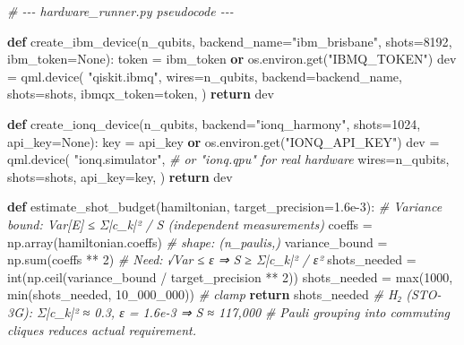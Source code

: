 \documentclass[
  11pt,
]{report}
\newenvironment{Shaded}{}{}
\newcommand{\BuiltInTok}[1]{\textcolor[rgb]{0.00,0.50,0.00}{#1}}
\newcommand{\CommentTok}[1]{\textcolor[rgb]{0.38,0.63,0.69}{\textit{#1}}}
\newcommand{\ControlFlowTok}[1]{\textcolor[rgb]{0.00,0.44,0.13}{\textbf{#1}}}
\newcommand{\DecValTok}[1]{\textcolor[rgb]{0.25,0.63,0.44}{#1}}
\newcommand{\FloatTok}[1]{\textcolor[rgb]{0.25,0.63,0.44}{#1}}
\newcommand{\KeywordTok}[1]{\textcolor[rgb]{0.00,0.44,0.13}{\textbf{#1}}}
\newcommand{\NormalTok}[1]{#1}
\newcommand{\OperatorTok}[1]{\textcolor[rgb]{0.40,0.40,0.40}{#1}}
\newcommand{\StringTok}[1]{\textcolor[rgb]{0.25,0.44,0.63}{#1}}
\newcommand{\VariableTok}[1]{\textcolor[rgb]{0.10,0.09,0.49}{#1}}
\begin{document}
\begin{Shaded}
\begin{Highlighting}[]
\CommentTok{\# {-}{-}{-} hardware\_runner.py pseudocode {-}{-}{-}}

\KeywordTok{def}\NormalTok{ create\_ibm\_device(n\_qubits, backend\_name}\OperatorTok{=}\StringTok{"ibm\_brisbane"}\NormalTok{,}
\NormalTok{                      shots}\OperatorTok{=}\DecValTok{8192}\NormalTok{, ibm\_token}\OperatorTok{=}\VariableTok{None}\NormalTok{):}
\NormalTok{    token }\OperatorTok{=}\NormalTok{ ibm\_token }\KeywordTok{or}\NormalTok{ os.environ.get(}\StringTok{"IBMQ\_TOKEN"}\NormalTok{)}
\NormalTok{    dev }\OperatorTok{=}\NormalTok{ qml.device(}
        \StringTok{"qiskit.ibmq"}\NormalTok{,}
\NormalTok{        wires}\OperatorTok{=}\NormalTok{n\_qubits,}
\NormalTok{        backend}\OperatorTok{=}\NormalTok{backend\_name,}
\NormalTok{        shots}\OperatorTok{=}\NormalTok{shots,}
\NormalTok{        ibmqx\_token}\OperatorTok{=}\NormalTok{token,}
\NormalTok{    )}
    \ControlFlowTok{return}\NormalTok{ dev}


\KeywordTok{def}\NormalTok{ create\_ionq\_device(n\_qubits, backend}\OperatorTok{=}\StringTok{"ionq\_harmony"}\NormalTok{,}
\NormalTok{                       shots}\OperatorTok{=}\DecValTok{1024}\NormalTok{, api\_key}\OperatorTok{=}\VariableTok{None}\NormalTok{):}
\NormalTok{    key }\OperatorTok{=}\NormalTok{ api\_key }\KeywordTok{or}\NormalTok{ os.environ.get(}\StringTok{"IONQ\_API\_KEY"}\NormalTok{)}
\NormalTok{    dev }\OperatorTok{=}\NormalTok{ qml.device(}
        \StringTok{"ionq.simulator"}\NormalTok{,           }\CommentTok{\# or "ionq.qpu" for real hardware}
\NormalTok{        wires}\OperatorTok{=}\NormalTok{n\_qubits,}
\NormalTok{        shots}\OperatorTok{=}\NormalTok{shots,}
\NormalTok{        api\_key}\OperatorTok{=}\NormalTok{key,}
\NormalTok{    )}
    \ControlFlowTok{return}\NormalTok{ dev}


\KeywordTok{def}\NormalTok{ estimate\_shot\_budget(hamiltonian, target\_precision}\OperatorTok{=}\FloatTok{1.6e{-}3}\NormalTok{):}
    \CommentTok{\# Variance bound: Var[E] ≤ Σ|c\_k|² / S  (independent measurements)}
\NormalTok{    coeffs }\OperatorTok{=}\NormalTok{ np.array(hamiltonian.coeffs)    }\CommentTok{\# shape: (n\_paulis,)}
\NormalTok{    variance\_bound }\OperatorTok{=}\NormalTok{ np.}\BuiltInTok{sum}\NormalTok{(coeffs }\OperatorTok{**} \DecValTok{2}\NormalTok{)}
    \CommentTok{\# Need: √Var ≤ ε ⇒ S ≥ Σ|c\_k|² / ε²}
\NormalTok{    shots\_needed }\OperatorTok{=} \BuiltInTok{int}\NormalTok{(np.ceil(variance\_bound }\OperatorTok{/}\NormalTok{ target\_precision }\OperatorTok{**} \DecValTok{2}\NormalTok{))}
\NormalTok{    shots\_needed }\OperatorTok{=} \BuiltInTok{max}\NormalTok{(}\DecValTok{1000}\NormalTok{, }\BuiltInTok{min}\NormalTok{(shots\_needed, }\DecValTok{10\_000\_000}\NormalTok{))  }\CommentTok{\# clamp}
    \ControlFlowTok{return}\NormalTok{ shots\_needed}
    \CommentTok{\# H₂ (STO{-}3G): Σ|c\_k|² ≈ 0.3, ε = 1.6e{-}3 ⇒ S ≈ 117,000}
    \CommentTok{\# Pauli grouping into commuting cliques reduces actual requirement.}
\end{Highlighting}
\end{Shaded}
\end{document}
